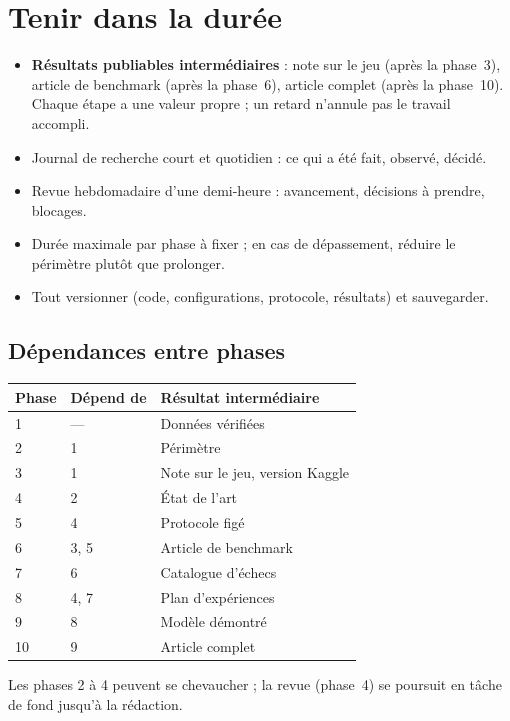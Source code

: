 \documentclass[11pt,a4paper]{article}
\begin{document}
\section{Tenir dans la durée}

\begin{itemize}
  \item \textbf{Résultats publiables intermédiaires} : note sur le jeu (après la phase~3), article de benchmark (après la phase~6), article complet (après la phase~10). Chaque étape a une valeur propre ; un retard n'annule pas le travail accompli.
  \item Journal de recherche court et quotidien : ce qui a été fait, observé, décidé.
  \item Revue hebdomadaire d'une demi-heure : avancement, décisions à prendre, blocages.
  \item Durée maximale par phase à fixer ; en cas de dépassement, réduire le périmètre plutôt que prolonger.
  \item Tout versionner (code, configurations, protocole, résultats) et sauvegarder.
\end{itemize}

\subsection*{Dépendances entre phases}
\par\smallskip
\begin{tabularx}{\textwidth}{@{}l X X@{}}
\toprule
\textbf{Phase} & \textbf{Dépend de} & \textbf{Résultat intermédiaire}\\
\midrule
1 & --- & Données vérifiées\\
2 & 1 & Périmètre\\
3 & 1 & Note sur le jeu, version Kaggle\\
4 & 2 & État de l'art\\
5 & 4 & Protocole figé\\
6 & 3, 5 & Article de benchmark\\
7 & 6 & Catalogue d'échecs\\
8 & 4, 7 & Plan d'expériences\\
9 & 8 & Modèle démontré\\
10 & 9 & Article complet\\
\bottomrule
\end{tabularx}

Les phases 2 à 4 peuvent se chevaucher ; la revue (phase~4) se poursuit en tâche de fond jusqu'à la rédaction.
\end{document}
